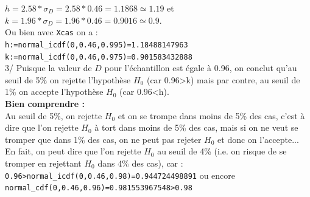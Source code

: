 \documentclass[a4paper,11pt]{book}
\begin{document}
\begin{itemize}
$h=2.58* \sigma_D=2.58*0.46=1.1868\simeq 1.19$ et\\
$k=1.96* \sigma_D=1.96*0.46=0.9016\simeq 0.9$.\\
Ou bien avec {\tt Xcas} on a :\\
{\tt h:=normal\_icdf(0,0.46,0.995)=1.18488147963}\\
{\tt k:=normal\_icdf(0,0.46,0.975)=0.901583432888}\\
3/ Puisque la valeur de $D$ pour l'\'echantillon est \'egale \`a 0.96, on 
conclut qu'au seuil de 5\% on rejette l'hypoth\`ese $H_0$ (car 0.96>k) mais 
par contre, au seuil de 1\% on accepte l'hypoth\`ese $H_0$ (car 0.96<h).\\
{\bf Bien comprendre :}\\
Au seuil de 5\%, on rejette $H_0$ et on se trompe dans moins de 5\% des cas, 
c'est \`a dire que l'on rejette $H_0$ \`a tort dans  moins de 5\% des cas, mais
 si on ne veut se tromper que dans 1\% des cas, on ne peut pas rejeter  $H_0$ 
et donc on l'accepte...\\
En fait, on peut dire que l'on rejette $H_0$ au seuil de 4\% (i.e. on risque de
 se tromper en rejettant $H_0$ dans  4\% des cas), car :\\ 
{\tt 0.96>normal\_icdf(0,0.46,0.98)=0.944724498891} ou encore \\
{\tt normal\_cdf(0,0.46,0.96)=0.981553967548>0.98}


\end{itemize}
\end{document}
